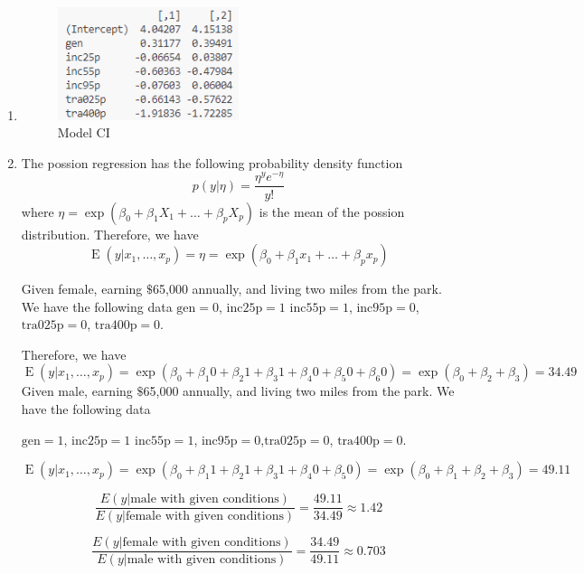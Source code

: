 \documentclass{article}
\DeclareMathOperator{\E}{E}
\begin{document}
\begin{enumerate}[label=(\alph*)]
  \item
  \begin{figure}[h]
      \centering
      \includegraphics[width=0.5\textwidth]{1e.png}
      \caption{Model CI}
  \end{figure}
  \item
    The possion regression has the following probability density function
    \[
      p(y|\eta) = \frac{\eta^y e^{-\eta}}{y!}
    \]
    where $\eta = \exp(\beta_0 + \beta_1 X_1 + \ldots + \beta_p X_p)$ is the mean of the possion distribution. Therefore, we have
    \[
      \E(y|x_1, \ldots, x_p) = \eta = \exp(\beta_0 + \beta_1 x_1 + \ldots + \beta_p x_p)
    \]

    Given female, earning \(\$\)65,000 annually, and living two miles from the park. We have the following data
    \(\text{gen} = 0\), \(\text{inc25p} = 1\) \(\text{inc55p} = 1\), \(\text{inc95p} = 0\),\(\text{tra025p} = 0\), \(\text{tra400p} = 0\).

    Therefore, we have
    \[
      \E(y|x_1, \ldots, x_p) = \exp(\beta_0 + \beta_1 0 + \beta_2 1 + \beta_3 1 + \beta_4 0 + \beta_5 0 + \beta_6 0) = \exp(\beta_0 + \beta_2 + \beta_3) = 34.49
    \]
    Given male, earning \(\$\)65,000 annually, and living two miles from the park. We have the following data

    \(\text{gen} = 1\), \(\text{inc25p} = 1\) \(\text{inc55p} = 1\), \(\text{inc95p} = 0\),\(\text{tra025p} = 0\), \(\text{tra400p} = 0\).

    \[
      \E(y|x_1, \ldots, x_p) = \exp(\beta_0 + \beta_1 1 + \beta_2 1 + \beta_3 1 + \beta_4 0 + \beta_5 0) = \exp(\beta_0 + \beta_1 + \beta_2 + \beta_3) = 49.11
    \]

    \[\frac{E(y|\text{male with given conditions})}{E(y|\text{female with given conditions})} = \frac{49.11}{34.49} \approx 1.42\]

    \[\frac{E(y|\text{female with given conditions})}{E(y|\text{male with given conditions})} = \frac{34.49}{49.11} \approx 0.703\]

\end{enumerate}
\end{document}

